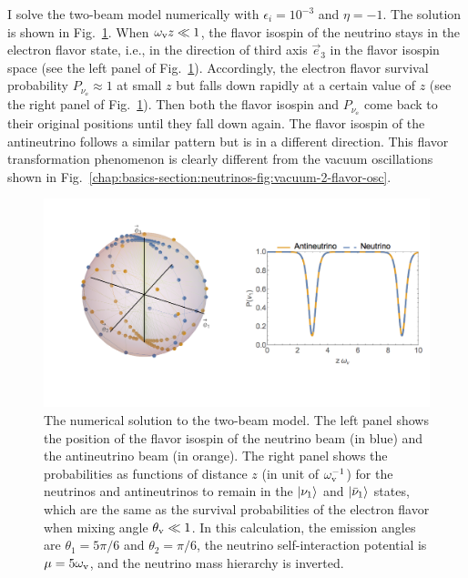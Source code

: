 I solve the two-beam model numerically with $\epsilon_i = 10^{-3}$ and $\eta=-1$. The solution is shown in Fig.~\ref{chap:collective-sec:two-beams-fig:two-beam-line-model-numerical-solution}. When $\omega_\mathrm v z \ll 1$, the flavor isospin of the neutrino stays in the electron flavor state, i.e., in the direction of third axis $\vec e_3$ in the flavor isospin space (see the left panel of Fig.~\ref{chap:collective-sec:two-beams-fig:two-beam-line-model-numerical-solution}). Accordingly, the electron flavor survival probability $P_{\nu_\ee}\approx 1$ at small $z$ but falls down rapidly at a certain value of $z$ (see the right panel of Fig.~\ref{chap:collective-sec:two-beams-fig:two-beam-line-model-numerical-solution}). Then both the flavor isospin and $P_{\nu_\ee}$ come back to their original positions until they fall down again. The flavor isospin of the antineutrino follows a similar pattern but is in a different direction. This flavor transformation phenomenon is clearly different from the vacuum oscillations shown in Fig.~\ref{chap:basics-section:neutrinos-fig:vacuum-2-flavor-osc}.

\begin{figure}[!htbp]
    \centering
    \includegraphics[width=\textwidth]{chapters/assets/collective/bipolar-animie100}
    \caption{The numerical solution to the two-beam model. The left panel shows the position of the flavor isospin of the neutrino beam (in blue) and the antineutrino beam (in orange). The right panel shows the probabilities as functions of distance $z$ (in unit of $\omega_\mathrm v^{-1}$) for the neutrinos and antineutrinos to remain in the $\left| \nu_1\right\rangle$ and $\left| \bar\nu_1\right\rangle$ states, which are the same as the survival probabilities of the electron flavor when mixing angle $\theta_\mathrm v \ll 1$. In this calculation, the emission angles are $\theta_1=5\pi/6$ and $\theta_2=\pi/6$, the neutrino self-interaction potential is $\mu=5 \omega_\mathrm v$, and the neutrino mass hierarchy is inverted. }
    \label{chap:collective-sec:two-beams-fig:two-beam-line-model-numerical-solution}
\end{figure}

